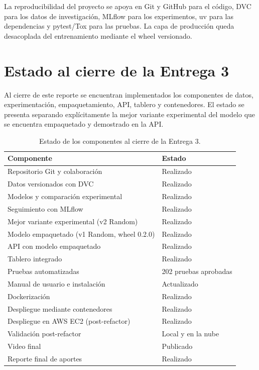 \documentclass[9pt]{article}
\begin{document}
La reproducibilidad del proyecto se apoya en Git y GitHub para el código, DVC
para los datos de investigación, MLflow para los experimentos, uv para las
dependencias y pytest/Tox para las pruebas. La capa de producción queda
desacoplada del entrenamiento mediante el wheel versionado.


\section{Estado al cierre de la Entrega 3}

Al cierre de este reporte se encuentran implementados los componentes de datos,
experimentación, empaquetamiento, API, tablero y contenedores. El estado se
presenta separando explícitamente la mejor variante experimental del modelo que
se encuentra empaquetado y demostrado en la API.

\begin{table}[H]
\centering
\footnotesize

\begin{tabular}{p{9cm}p{3cm}}
\toprule
\textbf{Componente} & \textbf{Estado} \\
\midrule
Repositorio Git y colaboración & Realizado \\
Datos versionados con DVC & Realizado \\
Modelos y comparación experimental & Realizado \\
Seguimiento con MLflow & Realizado \\
Mejor variante experimental (v2 Random) & Realizado \\
Modelo empaquetado (v1 Random, wheel 0.2.0) & Realizado \\
API con modelo empaquetado & Realizado \\
Tablero integrado & Realizado \\
Pruebas automatizadas & 202 pruebas aprobadas \\
Manual de usuario e instalación & Actualizado \\
Dockerización & Realizado \\
Despliegue mediante contenedores & Realizado \\
Despliegue en AWS EC2 (post-refactor) & Realizado \\
Validación post-refactor & Local y en la nube \\
Video final & Publicado \\
Reporte final de aportes & Realizado \\
\bottomrule
\end{tabular}

\caption{Estado de los componentes al cierre de la Entrega 3.}
\end{table}
\end{document}
